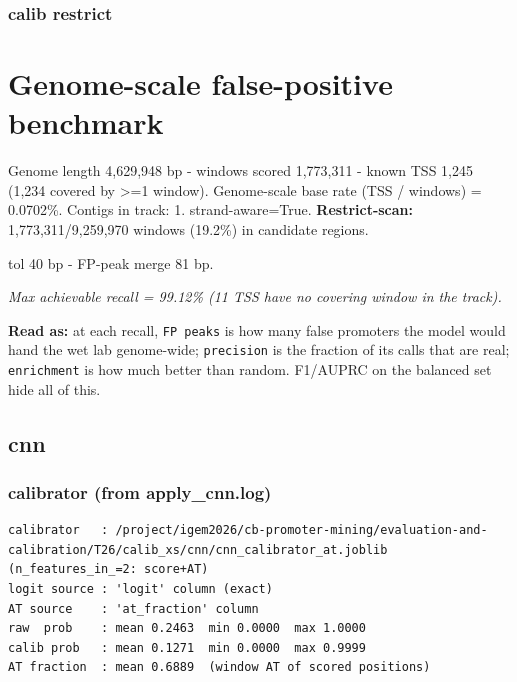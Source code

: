 \documentclass[10pt]{article}
\begin{document}
\subsubsection*{calib \textperiodcentered{} restrict}
\section*{Genome-scale false-positive benchmark}

Genome length 4,629,948 bp - windows scored 1,773,311 - known TSS 1,245 (1,234 covered by >=1 window). Genome-scale base rate (TSS / windows) = 0.0702\%. Contigs in track: 1. strand-aware=True. \textbf{Restrict-scan:} 1,773,311/9,259,970 windows (19.2\%) in candidate regions.

tol 40 bp - FP-peak merge 81 bp.

\begin{center}
\end{center}

{\itshape Max achievable recall = 99.12\% (11 TSS have no covering window in the track).}

\textbf{Read as:} at each recall, \texttt{FP peaks} is how many false promoters the model would hand the wet lab genome-wide; \texttt{precision} is the fraction of its calls that are real; \texttt{enrichment} is how much better than random. F1/AUPRC on the balanced set hide all of this.

\subsection*{cnn}

\subsubsection*{calibrator (from apply\_cnn.log)}
\begin{verbatim}
calibrator   : /project/igem2026/cb-promoter-mining/evaluation-and-calibration/T26/calib_xs/cnn/cnn_calibrator_at.joblib  (n_features_in_=2: score+AT)
logit source : 'logit' column (exact)
AT source    : 'at_fraction' column
raw  prob    : mean 0.2463  min 0.0000  max 1.0000
calib prob   : mean 0.1271  min 0.0000  max 0.9999
AT fraction  : mean 0.6889  (window AT of scored positions)
\end{verbatim}
\end{document}
